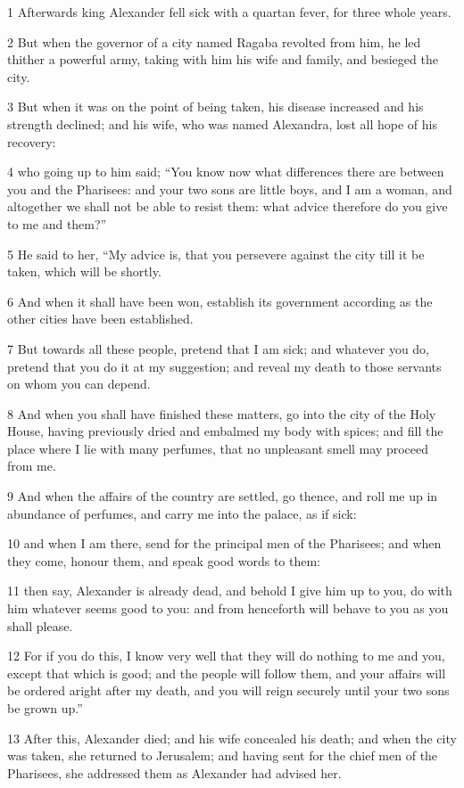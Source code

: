 1 Afterwards king Alexander fell sick with a quartan fever, for three whole years. 

2 But when the governor of a city named Ragaba revolted from him, he led thither a powerful army, taking with him his wife and family, and besieged the city. 

3 But when it was on the point of being taken, his disease increased and his strength declined; and his wife, who was named Alexandra, lost all hope of his recovery: 

4 who going up to him said; “You know now what differences there are between you and the Pharisees: and your two sons are little boys, and I am a woman, and altogether we shall not be able to resist them: what advice therefore do you give to me and them?” 

5 He said to her, “My advice is, that you persevere against the city till it be taken, which will be shortly. 

6 And when it shall have been won, establish its government according as the other cities have been established. 

7 But towards all these people, pretend that I am sick; and whatever you do, pretend that you do it at my suggestion; and reveal my death to those servants on whom you can depend. 

8 And when you shall have finished these matters, go into the city of the Holy House, having previously dried and embalmed my body with spices; and fill the place where I lie with many perfumes, that no unpleasant smell may proceed from me. 

9 And when the affairs of the country are settled, go thence, and roll me up in abundance of perfumes, and carry me into the palace, as if sick: 

10 and when I am there, send for the principal men of the Pharisees; and when they come, honour them, and speak good words to them: 

11 then say, Alexander is already dead, and behold I give him up to you, do with him whatever seems good to you: and from henceforth will behave to you as you shall please. 

12 For if you do this, I know very well that they will do nothing to me and you, except that which is good; and the people will follow them, and your affairs will be ordered aright after my death, and you will reign securely until your two sons be grown up.” 

13 After this, Alexander died; and his wife concealed his death; and when the city was taken, she returned to Jerusalem; and having sent for the chief men of the Pharisees, she addressed them as Alexander had advised her. 

